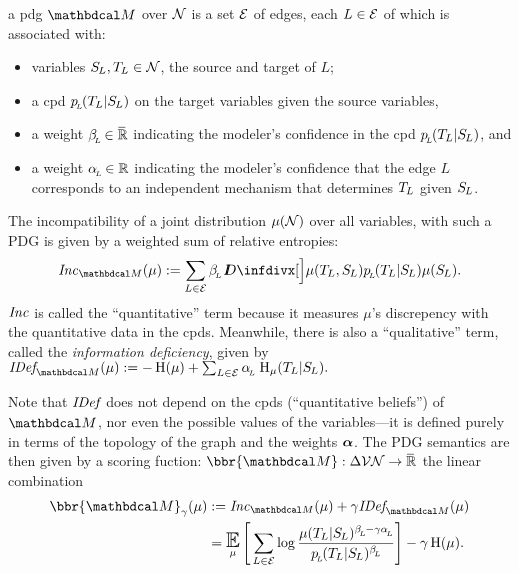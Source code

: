 \documentclass[twoside]{article}
\begin{document}
\begin{defn}
    a pdg $\dg M
    $
    over $\mathcal N$ is a set $\mathcal E$ of edges, 
    each $L \in \mathcal E$ of which is associated with:
    \begin{itemize}[nosep]
        \item variables $\Src L, \Tgt L \in \N$, the source and target of $L$;
        \item a cpd $p\ssub L (\Tgt L | \Src L)$ on the target variables given the source variables,
        \item a weight $\beta_{\!_{L}\!} \in \mskip1mu\overline{\mskip-1mu\mathbb R\!}\,$ indicating 
            the modeler's confidence in the cpd $p\ssub L(\Tgt L | \Src L)$, and 
        \item a weight $\alpha_{\!_{L}\!} \in \mathbb R$ indicating 
            the modeler's confidence that the edge $L$ corresponds to an independent mechanism that determines $\Tgt L$ given $\Src L$. 
        \qedhere
    \end{itemize}
\end{defn}

The incompatibility of a joint distribution $\mu(\mathcal N)$ over all variables, with such a PDG is given by a weighted sum of relative entropies:
\begin{align*}
    \Inc_{\dg M}(\mu) :=
        \sum_{L \in \Ed} \beta\ssub L\, \kldiv[\Big]{\mu(\Tgt L,\Src L)}{p\ssub L(\Tgt L | \Src L) \mu(\Src L)}.
\end{align*}
$\mathit{Inc}$ is called the ``quantitative'' term because it measures $\mu$'s discrepency
with the quantitative data in the cpds. 
Meanwhile, there is also a ``qualitative'' term, called the \emph{information deficiency}, given by
$
    \IDef{\dg M}(\mu) := - \H(\mu) + \sum_{L \in \Ed} \alpha\ssub L\, \H_\mu(\Tgt L | \Src L).
$

Note that $\mathit{IDef}_{\!}$ does not depend on the cpds (``quantitative beliefs'') of $\dg M$, nor even the possible values of the variables---it is defined purely in terms of the topology of the graph and the weights $\boldsymbol\alpha$. 
The PDG semantics are then given by a scoring fuction: 
$\bbr{\dg M}: \Delta \V\N \to \Rext$
the linear combination
\begin{align*}
    \bbr{\dg M}_\gamma(\mu) &:= \Inc_{\dg M}(\mu) + \gamma \IDef{\dg M}(\mu) 
        \\&= \EX_{\mu}\left[\, \sum_{L \in \Ed} \log \frac
            {\mu(\Tgt L| \Src L)^{\beta\ssub L - \gamma \alpha \ssub L}}
            {p\ssub L(\Tgt L | \Src L)^{\beta \ssub L}}
        \right] - \gamma \H(\mu)
        .
\end{align*}
\end{document}
